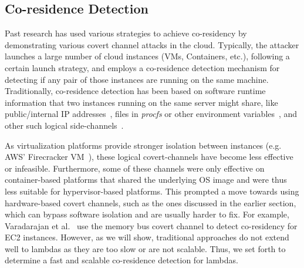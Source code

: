 \subsection{Co-residence Detection}
\label{sec:background:pastwork}

Past research has used various strategies to achieve co-residency by
demonstrating various covert channel attacks in the cloud. Typically, the
attacker launches a large number of cloud instances (VMs, Containers, etc.),
following a certain launch strategy, and employs a co-residence detection
mechanism for detecting if any pair of those instances are running on the same
machine. Traditionally, co-residence detection has been based on software
runtime information that two instances running on the same server might share,
like public/internal IP addresses~\cite{ristenpartccs2009}, files in
\textit{procfs} or other environment
variables~\cite{wangusenix2018,wuusenix2012}, and other such logical
side-channels~\cite{varad191016,vmplacement}.

As virtualization platforms provide stronger isolation between instances (e.g.
AWS' Firecracker VM~\cite{firecracker}), these logical covert-channels have
become less effective or infeasible. Furthermore, some of these channels were
only effective on container-based platforms that shared the underlying OS image
and were thus less suitable for hypervisor-based platforms.  This prompted a
move towards using hardware-based covert channels, such as the ones discussed in
the earlier section, which can bypass software isolation and are usually harder
to fix. For example, Varadarajan et al.~\cite{varadarajan2015} use the memory
bus covert channel to detect co-residency for EC2 instances.  However, as we
will show, traditional approaches do not extend well to lambdas as they are too
slow or are not scalable. Thus, we set forth to determine a fast and scalable
co-residence detection for lambdas.
